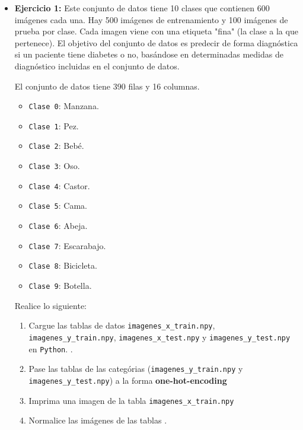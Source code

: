 \documentclass[spanish,12pt]{report}
\begin{document}
\begin{itemize}

\item {\bf{\color{Red} Ejercicio 1:}} {\sf [40 puntos]} Este conjunto de datos  tiene 10 clases que contienen 600 imágenes cada una. Hay 500 imágenes de entrenamiento y 100 imágenes de prueba por clase. Cada imagen viene con una etiqueta "fina" (la clase a la que pertenece). El objetivo del conjunto de datos es predecir de forma diagnóstica si un paciente tiene diabetes o no, basándose en determinadas medidas de diagnóstico incluidas en el conjunto de datos.

El conjunto de datos tiene 390 filas y 16 columnas.

\begin{itemize}

\item {\tt  Clase 0}: Manzana. 
\item {\tt  Clase 1}: Pez. 
\item {\tt  Clase 2}: Bebé.
\item {\tt  Clase 3}: Oso.
\item {\tt  Clase 4}: Castor.
\item {\tt  Clase 5}: Cama.
\item {\tt  Clase 6}: Abeja.
\item {\tt  Clase 7}: Escarabajo.
\item {\tt  Clase 8}: Bicicleta.
\item {\tt  Clase 9}: Botella.



\end{itemize}

Realice lo siguiente:

\begin{enumerate}
\item Cargue las tablas de datos  \texttt{imagenes\_x\_train.npy}, \texttt{imagenes\_y\_train.npy}, \texttt{imagenes\_x\_test.npy} y  \texttt{imagenes\_y\_test.npy}  en {\tt Python}. {\bf }.

\item Pase las tablas de las categórias (\texttt{imagenes\_y\_train.npy} y \texttt{imagenes\_y\_test.npy}) a la forma {\bf one-hot-encoding} 

\item Imprima una imagen de la tabla \texttt{imagenes\_x\_train.npy}

\item Normalice las imágenes de las tablas .   


\end{enumerate}
\end{itemize}
\end{document}
